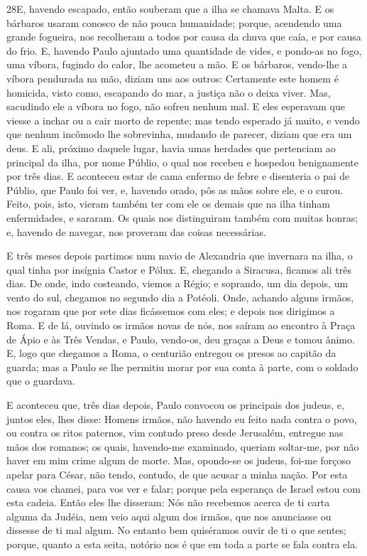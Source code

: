 \medskip

\lettrine{28} E, havendo escapado, então souberam que a ilha
se chamava Malta. E os bárbaros usaram conosco de não pouca
humanidade; porque, acendendo uma grande fogueira, nos recolheram a
todos por causa da chuva que caía, e por causa do frio. E,
havendo Paulo ajuntado uma quantidade de vides, e pondo-as no fogo,
uma víbora, fugindo do calor, lhe acometeu a mão. E os bárbaros,
vendo-lhe a víbora pendurada na mão, diziam uns aos outros:
Certamente este homem é homicida, visto como, escapando do mar, a
justiça não o deixa viver. Mas, sacudindo ele a víbora no fogo,
não sofreu nenhum mal. E eles esperavam que viesse a inchar ou a
cair morto de repente; mas tendo esperado já muito, e vendo que
nenhum incômodo lhe sobrevinha, mudando de parecer, diziam que era
um deus. E ali, próximo daquele lugar, havia umas herdades que
pertenciam ao principal da ilha, por nome Públio, o qual nos recebeu
e hospedou benignamente por três dias. E aconteceu estar de cama
enfermo de febre e disenteria o pai de Públio, que Paulo foi ver, e,
havendo orado, pôs as mãos sobre ele, e o curou. Feito, pois,
isto, vieram também ter com ele os demais que na ilha tinham
enfermidades, e sararam. Os quais nos distinguiram também com
muitas honras; e, havendo de navegar, nos proveram das coisas
necessárias.

E três meses depois partimos num navio de Alexandria que
invernara na ilha, o qual tinha por insígnia Castor e Pólux.
E, chegando a Siracusa, ficamos ali três dias. De
onde, indo costeando, viemos a Régio; e soprando, um dia depois, um
vento do sul, chegamos no segundo dia a Potéoli. Onde,
achando alguns irmãos, nos rogaram que por sete dias ficássemos com
eles; e depois nos dirigimos a Roma. E de lá, ouvindo os
irmãos novas de nós, nos saíram ao encontro à Praça de Ápio e às
Três Vendas, e Paulo, vendo-os, deu graças a Deus e tomou ânimo.
E, logo que chegamos a Roma, o centurião entregou os presos
ao capitão da guarda; mas a Paulo se lhe permitiu morar por sua
conta à parte, com o soldado que o guardava.

E aconteceu que, três dias depois, Paulo convocou os principais
dos judeus, e, juntos eles, lhes disse: Homens irmãos, não havendo
eu feito nada contra o povo, ou contra os ritos paternos, vim
contudo preso desde Jerusalém, entregue nas mãos dos romanos;
os quais, havendo-me examinado, queriam soltar-me, por não
haver em mim crime algum de morte. Mas, opondo-se os judeus,
foi-me forçoso apelar para César, não tendo, contudo, de que acusar
a minha nação. Por esta causa vos chamei, para vos ver e
falar; porque pela esperança de Israel estou com esta cadeia.
Então eles lhe disseram: Nós não recebemos acerca de ti carta
alguma da Judéia, nem veio aqui algum dos irmãos, que nos anunciasse
ou dissesse de ti mal algum. No entanto bem quiséramos ouvir
de ti o que sentes; porque, quanto a esta seita, notório nos é que
em toda a parte se fala contra ela.

